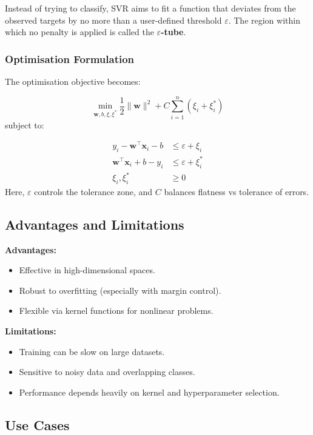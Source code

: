 \documentclass[9pt]{extarticle}
\begin{document}
Instead of trying to classify, SVR aims to fit a function that deviates from the observed targets by no more than a user-defined threshold $\varepsilon$. The region within which no penalty is applied is called the \textbf{$\varepsilon$-tube}.

\subsubsection*{Optimisation Formulation}

The optimisation objective becomes:

\[
\min_{\mathbf{w}, b, \xi, \xi^*} \frac{1}{2} \|\mathbf{w}\|^2 + C \sum_{i=1}^n (\xi_i + \xi_i^*)
\]
subject to:

\[
\begin{aligned}
y_i - \mathbf{w}^\top \mathbf{x}_i - b &\leq \varepsilon + \xi_i \\
\mathbf{w}^\top \mathbf{x}_i + b - y_i &\leq \varepsilon + \xi_i^* \\
\xi_i, \xi_i^* &\geq 0
\end{aligned}
\]
Here, $\varepsilon$ controls the tolerance zone, and $C$ balances flatness vs tolerance of errors.

\subsection{Advantages and Limitations}

\textbf{Advantages:}
\begin{itemize}
    \item Effective in high-dimensional spaces.
    \item Robust to overfitting (especially with margin control).
    \item Flexible via kernel functions for nonlinear problems.
\end{itemize}

\textbf{Limitations:}
\begin{itemize}
    \item Training can be slow on large datasets.
    \item Sensitive to noisy data and overlapping classes.
    \item Performance depends heavily on kernel and hyperparameter selection.
\end{itemize}

\subsection{Use Cases}
\end{document}
